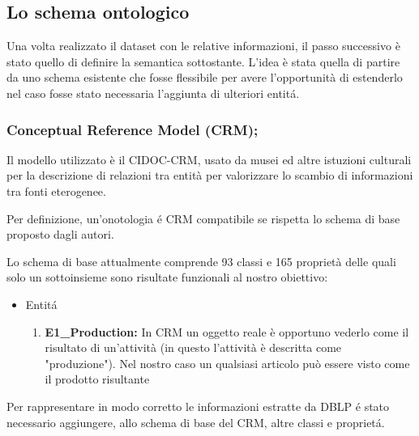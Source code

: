 \documentclass[11pt,a4paper]{article}
\begin{document}





\subsection{Lo schema ontologico}
Una volta realizzato il dataset con le relative informazioni, il passo successivo è stato quello di definire la semantica sottostante. L'idea è stata quella di partire da uno schema esistente che fosse flessibile per avere l'opportunità di estenderlo nel caso fosse stato necessaria l'aggiunta di ulteriori entit\'a.

\subsubsection{Conceptual Reference Model (CRM);}
Il modello utilizzato è il CIDOC-CRM, usato da musei ed altre istuzioni culturali per la descrizione di relazioni tra entità per valorizzare lo scambio di informazioni tra fonti eterogenee.
 
Per definizione, un'onotologia \'e CRM compatibile se rispetta lo schema di base proposto dagli autori.

 Lo schema di base attualmente comprende  93 classi e 165 proprietà delle quali solo un sottoinsieme sono risultate funzionali al nostro obiettivo:
	 \begin{itemize}
	 	\item Entit\'a
	 	\begin{enumerate}
	 		\item \textbf{E1\_Production:} In CRM un oggetto reale è opportuno vederlo come il risultato di un'attività (in questo l'attività è descritta come "produzione"). Nel nostro caso un qualsiasi articolo può essere visto come il prodotto risultante
	 	\end{enumerate}
	 \end{itemize}
 
 Per rappresentare in modo corretto le informazioni estratte da DBLP \'e stato necessario aggiungere, allo schema di base del CRM, altre classi e propriet\'a. 
  
\end{document}
